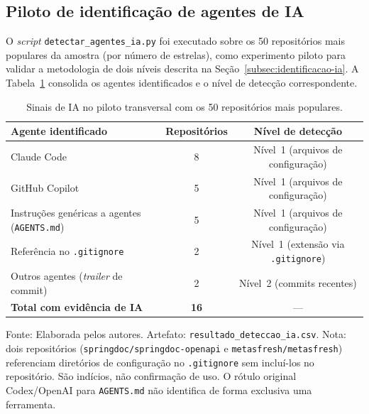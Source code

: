 \subsection{Piloto de identificação de agentes de IA}
\label{subsec:res-piloto-ia}

O \emph{script} \texttt{detectar\_agentes\_ia.py} foi executado sobre os 50 repositórios mais populares da amostra (por número de estrelas), como experimento piloto para validar a metodologia de dois níveis descrita na Seção~\ref{subsec:identificacao-ia}. A Tabela~\ref{tab:piloto-ia} consolida os agentes identificados e o nível de detecção correspondente.

\begin{table}[H]
    \centering
    \caption{Sinais de IA no piloto transversal com os 50 repositórios mais populares.}
    \label{tab:piloto-ia}
    \footnotesize
    \renewcommand{\arraystretch}{1.2}
    \begin{tabularx}{\linewidth}{|>{\raggedright\arraybackslash}X|c|c|}
        \hline
        \textbf{Agente identificado} & \textbf{Repositórios} & \textbf{Nível de detecção} \\
        \hline
        Claude Code & 8 & Nível~1 (arquivos de configuração) \\
        \hline
        GitHub Copilot & 5 & Nível~1 (arquivos de configuração) \\
        \hline
        Instruções genéricas a agentes (\texttt{AGENTS.md}) & 5 & Nível~1 (arquivos de configuração) \\
        \hline
        Referência no \texttt{.gitignore} & 2 & Nível~1 (extensão via \texttt{.gitignore}) \\
        \hline
        Outros agentes (\emph{trailer} de commit) & 2 & Nível~2 (commits recentes) \\
        \hline
        \textbf{Total com evidência de IA} & \textbf{16} & --- \\
        \hline
    \end{tabularx}
    \vspace{4pt}
    {\footnotesize Fonte: Elaborada pelos autores. Artefato: \texttt{resultado\_deteccao\_ia.csv}. Nota: dois repositórios (\texttt{springdoc/springdoc-openapi} e \texttt{metasfresh/metasfresh}) referenciam diretórios de configuração no \texttt{.gitignore} sem incluí-los no repositório. São indícios, não confirmação de uso. O rótulo original Codex/OpenAI para \texttt{AGENTS.md} não identifica de forma exclusiva uma ferramenta.}
\end{table}


